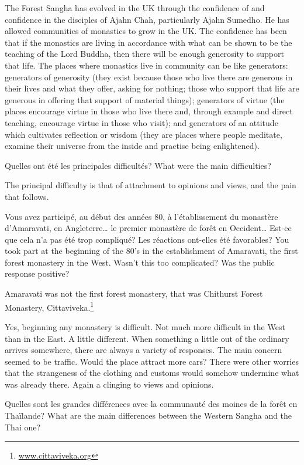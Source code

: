\answer{}
The Forest Sangha has evolved in the UK through the confidence of and
confidence in the disciples of Ajahn Chah, particularly Ajahn Sumedho. 
He has allowed communities of monastics to grow in the UK. The
confidence has been that if the monastics are living in accordance with
what can be shown to be the teaching of the Lord Buddha, then there will
be enough generosity to support that life. The places where monastics
live in community can be like generators: generators of generosity (they
exist because those who live there are generous in their lives and what
they offer, asking for nothing; those who support that life are generous
in offering that support of material things); generators of virtue (the
places encourage virtue in those who live there and, through example and
direct teaching, encourage virtue in those who visit); and generators of
an attitude which cultivates reflection or wisdom (they are places where
people meditate, examine their universe from the inside and practise
being enlightened). 

\questionBi%
{Quelles ont été les principales difficultés?}%
{What were the main difficulties?}

\answer{}
The principal difficulty is that of attachment to opinions and views,
and the pain that follows.

\questionBi%
{Vous avez participé, au début des années 80, à l'établissement du monastère d'Amaravati, en Angleterre\ldots{} le premier monastère de forêt en Occident\ldots{} Est-ce que cela n'a pas été trop compliqué? Les réactions ont-elles été favorables?}
{You took part at the beginning of the 80's in the establishment of Amaravati, the first forest monastery in the West. Wasn't this too complicated? Was the public response positive?}

\answer{}
Amaravati was not the first forest monastery, that was Chithurst
Forest Monastery, Cittaviveka.\footnote{\href{http://cittaviveka.org}{www.cittaviveka.org}}

Yes, beginning any monastery is difficult. Not much more difficult in
the West than in the East. A little different. When something a little
out of the ordinary arrives somewhere, there are always a variety of
responses. The main concern seemed to be traffic. Would the place
attract more cars? There were other worries that the strangeness of the
clothing and customs would somehow undermine what was already there. 
Again a clinging to views and opinions. 

\questionBi%
{Quelles sont les grandes différences avec la communauté des moines de la forêt en Thaïlande?}%
{What are the main differences between the Western Sangha and the Thai one?}

